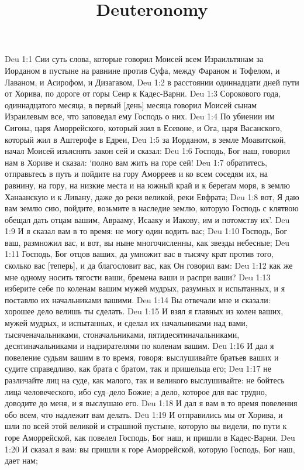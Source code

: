 

\title{Deuteronomy}

Deu 1:1  Сии суть слова, которые говорил Моисей всем Израильтянам за Иорданом в пустыне на равнине против Суфа, между Фараном и Тофелом, и Лаваном, и Асирофом, и Дизагавом,
Deu 1:2  в расстоянии одиннадцати дней пути от Хорива, по дороге от горы Сеир к Кадес-Варни.
Deu 1:3  Сорокового года, одиннадцатого месяца, в первый [день] месяца говорил Моисей сынам Израилевым все, что заповедал ему Господь о них.
Deu 1:4  По убиении им Сигона, царя Аморрейского, который жил в Есевоне, и Ога, царя Васанского, который жил в Аштерофе в Едреи,
Deu 1:5  за Иорданом, в земле Моавитской, начал Моисей изъяснять закон сей и сказал:
Deu 1:6  Господь, Бог наш, говорил нам в Хориве и сказал: `полно вам жить на горе сей!
Deu 1:7  обратитесь, отправьтесь в путь и пойдите на гору Аморреев и ко всем соседям их, на равнину, на гору, на низкие места и на южный край и к берегам моря, в землю Ханаанскую и к Ливану, даже до реки великой, реки Евфрата;
Deu 1:8  вот, Я даю вам землю сию, пойдите, возьмите в наследие землю, которую Господь с клятвою обещал дать отцам вашим, Аврааму, Исааку и Иакову, им и потомству их'.
Deu 1:9  И я сказал вам в то время: не могу один водить вас;
Deu 1:10  Господь, Бог ваш, размножил вас, и вот, вы ныне многочисленны, как звезды небесные;
Deu 1:11  Господь, Бог отцов ваших, да умножит вас в тысячу крат против того, сколько вас [теперь], и да благословит вас, как Он говорил вам:
Deu 1:12  как же мне одному носить тягости ваши, бремена ваши и распри ваши?
Deu 1:13  изберите себе по коленам вашим мужей мудрых, разумных и испытанных, и я поставлю их начальниками вашими.
Deu 1:14  Вы отвечали мне и сказали: хорошее дело велишь ты сделать.
Deu 1:15  И взял я главных из колен ваших, мужей мудрых, и испытанных, и сделал их начальниками над вами, тысяченачальниками, стоначальниками, пятидесятиначальниками, десятиначальниками и надзирателями по коленам вашим.
Deu 1:16  И дал я повеление судьям вашим в то время, говоря: выслушивайте братьев ваших и судите справедливо, как брата с братом, так и пришельца его;
Deu 1:17  не различайте лиц на суде, как малого, так и великого выслушивайте: не бойтесь лица человеческого, ибо суд--дело Божие; а дело, которое для вас трудно, доводите до меня, и я выслушаю его.
Deu 1:18  И дал я вам в то время повеления обо всем, что надлежит вам делать.
Deu 1:19  И отправились мы от Хорива, и шли по всей этой великой и страшной пустыне, которую вы видели, по пути к горе Аморрейской, как повелел Господь, Бог наш, и пришли в Кадес-Варни.
Deu 1:20  И сказал я вам: вы пришли к горе Аморрейской, которую Господь, Бог наш, дает нам;
